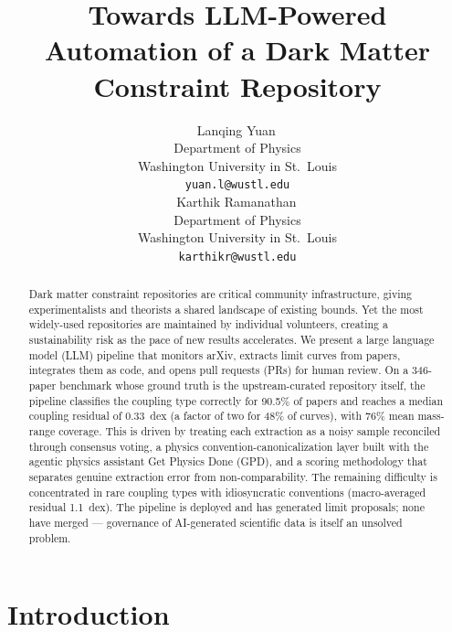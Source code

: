 \documentclass{article}
\title{Towards LLM-Powered Automation of a Dark Matter Constraint Repository}
\author{%
  Lanqing Yuan\,\orcidlink{0000-0003-0024-8017} \\
  Department of Physics \\
  Washington University in St.\ Louis \\
  \texttt{yuan.l@wustl.edu} \\
  \And
  Karthik Ramanathan\,\orcidlink{0000-0003-4215-7834} \\
  Department of Physics \\
  Washington University in St.\ Louis \\
  \texttt{karthikr@wustl.edu} \\
}
\begin{document}
\maketitle

\renewcommand{\thefootnote}{\fnsymbol{footnote}}
\renewcommand{\thefootnote}{\arabic{footnote}}
\setcounter{footnote}{0}

\begin{abstract}
Dark matter constraint repositories are critical community infrastructure, giving experimentalists and theorists a shared landscape of existing bounds. Yet the most widely-used repositories are maintained by individual volunteers, creating a sustainability risk as the pace of new results accelerates.
We present a large language model (LLM) pipeline that monitors arXiv, extracts limit curves from papers, integrates them as code, and opens pull requests (PRs) for human review.
On a 346-paper benchmark whose ground truth is the upstream-curated repository itself, the pipeline classifies the coupling type correctly for 90.5\% of papers and reaches a median coupling residual of 0.33~dex (a factor of two for 48\% of curves), with 76\% mean mass-range coverage.
This is driven by treating each extraction as a noisy sample reconciled through consensus voting, a physics convention-canonicalization layer built with the agentic physics assistant Get Physics Done (GPD), and a scoring methodology that separates genuine extraction error from non-comparability.
The remaining difficulty is concentrated in rare coupling types with idiosyncratic conventions (macro-averaged residual 1.1~dex). The pipeline is deployed and has generated limit proposals; none have merged --- governance of AI-generated scientific data is itself an unsolved problem.
\end{abstract}

\section{Introduction}
\end{document}
